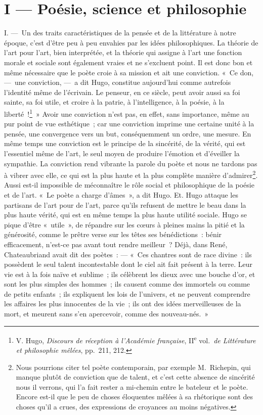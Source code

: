 \documentclass[french,twoside]{book} %
\begin{document}
\section[{I — Poésie, science et philosophie}]{I — Poésie, science et philosophie}
\noindent I. — Un des traits caractéristiques de la pensée et de la littérature à notre époque, c’est d’être peu à peu envahies par les idées philosophiques. La théorie de l’art pour l’art, bien interprétée, et la théorie qui assigne à l’art une fonction morale et sociale sont également vraies et ne s’excluent point. Il est donc bon et même nécessaire que le poète croie à sa mission et ait une conviction. « Ce don, — une conviction, — a dit Hugo, constitue aujourd’hui comme autrefois l’identité même de l’écrivain. Le penseur, en ce siècle, peut avoir aussi sa foi sainte, sa foi utile, et croire à la patrie, à l’intelligence, à la poésie, à la liberté !\footnote{ V. Hugo, \emph{Discours de réception à l’Académie française}, II\textsuperscript{e} vol. \emph{de Littérature et philosophie mêlées}, pp. 211, 212.} » Avoir une conviction n’est pas, en effet, sans importance, même au pur point de vue esthétique ; car une conviction imprime une certaine unité à la pensée, une convergence vers un but, conséquemment un ordre, une mesure. En même temps une conviction est le principe de la sincérité, de la vérité, qui est l’essentiel même de l’art, le seul moyen de produire l’émotion et d’éveiller la sympathie. La conviction rend vibrante la parole du poète et nous ne tardons pas à vibrer avec elle, ce qui est la plus haute et la plus complète manière d’admirer\footnote{Nous pourrions citer tel poète contemporain, par exemple M. Richepin, qui manque plutôt de conviction que de talent, et c’est cette absence de sincérité nous il verrons, qui l’a fait rester a mi-chemin entre le bateleur et le poète. Encore est-il que le peu de choses éloquentes mêlées à sa rhétorique sont des choses qu’il a crues, des expressions de croyances au moins négatives.}. Aussi est-il impossible de méconnaître le rôle social et philosophique de la poésie et de l’art. « Le poète a charge d’âmes », a dit Hugo. Et. Hugo attaque les partisans de l’art pour de l’art, parce qu’ils refusent de mettre le beau dans la plus haute vérité, qui est en même temps la plus haute utilité sociale. Hugo se pique d’être « utile », de répandre sur les cœurs à pleines mains la pitié et la générosité, comme le prêtre verse sur les têtes ses bénédictions : bénir efficacement, n’est-ce pas avant tout rendre meilleur ? Déjà, dans René, Chateaubriand avait dit des poètes : — « Ces chantres sont de race divine : ils possèdent le seul talent incontestable dont le ciel ait fait présent à la terre. Leur vie est à la fois naïve et sublime ; ils célèbrent les dieux avec une bouche d’or, et sont les plus simples des hommes ; ils causent comme des immortels ou comme de petits enfants ; ils expliquent les lois de l’univers, et ne peuvent comprendre les affaires les plus innocentes de la vie ; ils ont des idées merveilleuses de la mort, et meurent sans s’en apercevoir, comme des nouveau-nés. »\par
\end{document}
